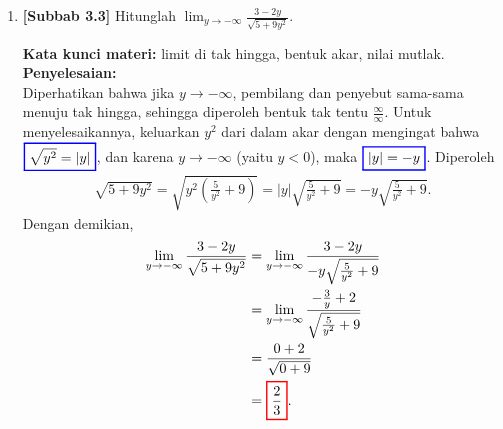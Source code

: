 \documentclass[10pt,openany,a4paper]{article}
\theoremstyle{definition}
\theoremstyle{definition}
\theoremstyle{plain}
\newenvironment{jawab}[2][tes]{%
\par\noindent\textbf{Kata kunci materi:} #1.\\
\textbf{Penyelesaian:} #2%
}{}
\begin{document}
\begin{enumerate}
    \item \textbf{[Subbab 3.3]} Hitunglah $\displaystyle\lim_{y\to-\infty}\frac{3-2y}{\sqrt{5+9y^2}}$.
    \begin{jawab}[limit di tak hingga, bentuk akar, nilai mutlak]{~\\
        Diperhatikan bahwa jika $y\to-\infty$, pembilang dan penyebut sama-sama menuju tak hingga, sehingga diperoleh bentuk tak tentu $\frac{\infty}{\infty}$. Untuk menyelesaikannya, keluarkan $y^2$ dari dalam akar dengan mengingat bahwa $\colorlet{oldcolor}{.}
        \color{blue}
        \setlength{\fboxrule}{1pt} \boxed{\color{oldcolor}\sqrt{y^2}=|y|}\color{oldcolor}$, dan karena $y\to-\infty$ (yaitu $y<0$), maka $\colorlet{oldcolor}{.}
        \color{blue}
        \setlength{\fboxrule}{1pt} \boxed{\color{oldcolor}|y|=-y}\color{oldcolor}$. Diperoleh
        \begin{align*}
            \sqrt{5+9y^2} = \sqrt{y^2\left(\frac{5}{y^2}+9\right)} = |y|\sqrt{\frac{5}{y^2}+9} = -y\sqrt{\frac{5}{y^2}+9}.
        \end{align*}
        Dengan demikian,
        \begin{align*}
            \lim_{y\to-\infty}\frac{3-2y}{\sqrt{5+9y^2}} &= \lim_{y\to-\infty}\frac{3-2y}{-y\sqrt{\frac{5}{y^2}+9}}\\
            &= \lim_{y\to-\infty}\frac{-\frac{3}{y}+2}{\sqrt{\frac{5}{y^2}+9}}\\
            &= \frac{0+2}{\sqrt{0+9}}\\
            &= \colorlet{oldcolor}{.}
        \color{red}
        \setlength{\fboxrule}{1pt} \boxed{\color{oldcolor}\frac{2}{3}}\color{oldcolor}.
        \end{align*}
    }
    \end{jawab}


\end{enumerate}
\end{document}
